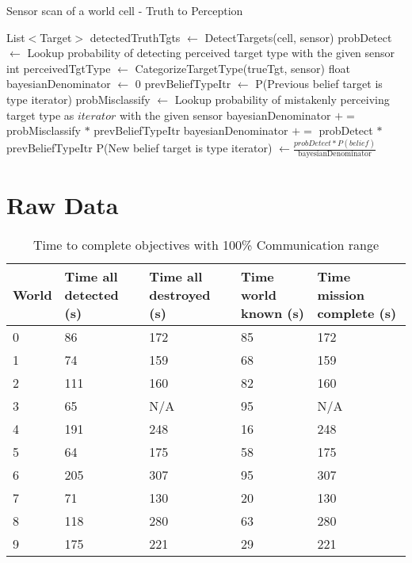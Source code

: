 \begin{algorithm}[H]
	\caption{Sensor scan of a world cell - Truth to Perception}
	\label{alg:sensorScan}
	\begin{algorithmic}[1]
		\State List$<$Target$>$ detectedTruthTgts $\gets$ DetectTargets(cell, sensor)
		\State probDetect $\gets$ Lookup probability of detecting perceived target type with the given sensor
			\State int perceivedTgtType $\gets$ CategorizeTargetType(trueTgt, sensor)
			\State float bayesianDenominator $\gets$ 0
				\State prevBeliefTypeItr $\gets$ P(Previous belief target is type iterator)
					\State probMisclassify $ \gets $ Lookup probability of mistakenly perceiving target type as $iterator$ with the given sensor
					\State bayesianDenominator $\mathrel{+}=$ probMisclassify $*$ prevBeliefTypeItr
				\Else
					\State bayesianDenominator $\mathrel{+}=$ probDetect $*$ prevBeliefTypeItr
				\EndIf
			\EndFor
			\State P(New belief target is type iterator) $\gets \frac{probDetect * P(belief)}{\text{bayesianDenominator}}$

		\EndFor
		\EndFunction
	\end{algorithmic}
\end{algorithm}


\chapter{Raw Data}
\label{sec:raw_data}
\begin{table}[H]
	\caption{Time to complete objectives with 100\% Communication range}
	\centering
	\label{tab:comm100}
	
	\begin{tabular}{|p{1cm}|p{1.75cm}|p{1.75cm}|p{1.5cm}|p{2cm}|}
		\hline
		World & Time all detected (s) & Time all destroyed (s) & Time world known (s) & Time mission complete (s) \\
		\hline
		0&	 86 & 172 & 85 & 172 \\ \hline
		1&	 74 & 159 & 68 & 159 \\ \hline
		2&	111 & 160 & 82 & 160 \\ \hline
		3&	 65 & N/A & 95 & N/A \\ \hline
		4&	191 & 248 & 16 & 248 \\ \hline
		5&	 64 & 175 & 58 & 175 \\ \hline
		6&	205 & 307 & 95 & 307 \\ \hline
		7&	 71 & 130 & 20 & 130 \\ \hline
		8&	118 & 280 & 63 & 280 \\ \hline
		9&	175 & 221 & 29 & 221 \\ \hline
	\end{tabular}
\end{table}



